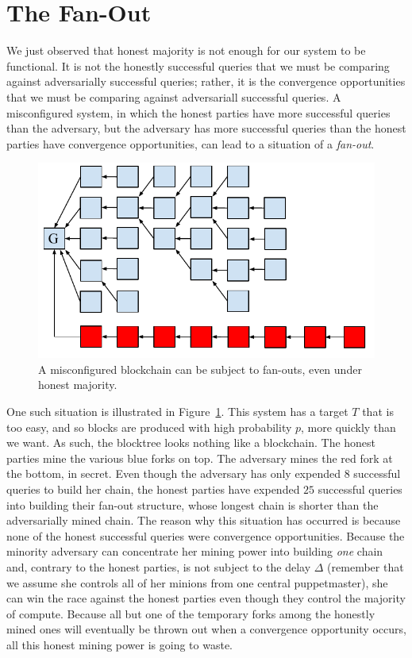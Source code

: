 \section{The Fan-Out}

We just observed that honest majority is not enough for our system to be functional. It is not
the honestly successful queries that we must be comparing against adversarially successful queries;
rather, it is the convergence opportunities that we must be comparing against adversariall successful
queries. A misconfigured system, in which the honest parties have more successful queries than the
adversary, but the adversary has more successful queries than the honest parties have convergence
opportunities, can lead to a situation of a \emph{fan-out}.

\begin{figure}[h]
    \centering
    \includegraphics[width=0.8 \columnwidth,keepaspectratio]{figures/fan-out.pdf}
    \caption{A misconfigured blockchain can be subject to fan-outs, even under honest majority.}
    \label{fig.fan-out}
\end{figure}

One such situation is illustrated in Figure~\ref{fig.fan-out}. This system has a target $T$
that is too easy, and so blocks are produced with high probability $p$, more quickly than we
want. As such, the blocktree looks nothing like a blockchain. The honest parties mine the
various blue forks on top. The adversary mines the red fork at the bottom, in secret.
Even though the adversary has only expended $8$ successful queries to build her chain,
the honest parties have expended $25$ successful queries into building their fan-out
structure, whose longest chain is shorter than the adversarially mined chain. The reason
why this situation has occurred is because none of the honest successful queries were
convergence opportunities. Because the minority adversary can concentrate her mining
power into building \emph{one} chain and, contrary to the honest parties, is not subject
to the delay $\Delta$ (remember that we assume she controls all of her minions from one
central puppetmaster), she can win the race against the honest parties even though they
control the majority of compute. Because all but one of the temporary forks among the
honestly mined ones will eventually be thrown out when a convergence opportunity occurs,
all this honest mining power is going to waste.

